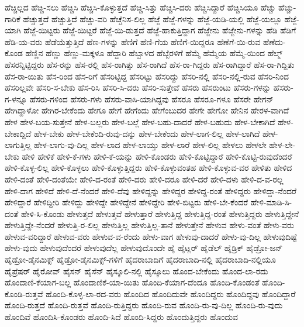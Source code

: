 {ಹೆಚ್ಚಿಲ್ಲದ
ಹೆಚ್ಚಿ-ಸಲು
ಹೆಚ್ಚಿಸಿ
ಹೆಚ್ಚಿಸಿ-ಕೊಳ್ಳುತ್ತದೆ
ಹೆಚ್ಚಿ-ಸಿತ್ತು
ಹೆಚ್ಚಿಸಿ-ದರು
ಹೆಚ್ಚಿಸಿದ್ದಾರೆ
ಹೆಚ್ಚಿಸಿಯೂ
ಹೆಚ್ಚು
ಹೆಚ್ಚು-ಗಾರಿಕೆ
ಹೆಚ್ಚುತ್ತದೆ
ಹೆಚ್ಚುತ್ತಿದೆ
ಹೆಚ್ಚು-ವರಿ
ಹೆಚ್ಚೆನಿಸ-ಲಿಲ್ಲ
ಹೆಜ್ಜೆ
ಹೆಜ್ಜೆ-ಗಳನ್ನು
ಹೆಜ್ಜೆ-ಯಡಿ-ಯಲ್ಲಿ
ಹೆಜ್ಜೆ-ಯಲ್ಲೂ
ಹೆಜ್ಜೆ-ಯಾಗಿ
ಹೆಜ್ಜೆ-ಯಿಟ್ಟರು
ಹೆಜ್ಜೆ-ಯಿಟ್ಟರೆ
ಹೆಜ್ಜೆ-ಯಿ-ಡುತ್ತದೆ
ಹೆಜ್ಜೆ-ಹಾಕುತ್ತಿದ್ದಾಗ
ಹೆಜ್ಜೇನು
ಹೆಜ್ಜೇನು-ಗಳನ್ನು
ಹೆಡಿ
ಹೆಡಿಗೆ
ಹೆಡಿ-ಯ-ವರು
ಹೆಡೆಯೆತ್ತುತ್ತಿದೆ
ಹೆಣ-ಗಳನ್ನು
ಹೆಣಿಗೆ
ಹೆಣಿ-ಗೆಯ
ಹೆಣಿಗೆ-ಯಿದ್ದರೂ
ಹೆಣೆಗೆ-ಯಿ-ರುವ
ಹೆಣೆದು-ಕೊಂಡ
ಹೆಣ್ಣಿನ
ಹೆಣ್ಣು
ಹೆಣ್ಣು-ಮಕ್ಕಳೂ
ಹೆದ್ದಾರಿ
ಹೆಬ್ಬಾಳದ
ಹೆಬ್ಬೆರಳಿಗೆ
ಹೆಮ್ಮೆ
ಹೆಮ್ಮೆಯ
ಹೆಮ್ಮೆ-ಯಿಂದ
ಹೆಲ್ಮ್
ಹೆಸರನ್ನಿಟ್ಟಿದ್ದರು
ಹೆಸ-ರನ್ನು
ಹೆಸ-ರಲ್ಲಿ
ಹೆಸ-ರಾಗಿತ್ತು
ಹೆಸ-ರಾಗಿದೆ
ಹೆಸ-ರಾ-ಗಿದ್ದರು
ಹೆಸ-ರಾಗಿದ್ದಾರೆ
ಹೆಸ-ರಾ-ಗಿದ್ದಿತು
ಹೆಸ-ರಾ-ಯಿತು
ಹೆಸ-ರಿಂದ
ಹೆಸ-ರಿಗೆ
ಹೆಸರಿಟ್ಟಿದ್ದ
ಹೆಸರಿಟ್ಟು
ಹೆಸರಿದ್ದು
ಹೆಸರಿ-ನಲ್ಲಿ
ಹೆಸರಿ-ನಲ್ಲಿ-ರುವ
ಹೆಸರಿ-ನಿಂದ
ಹೆಸರಿಲ್ಲವೇ
ಹೆಸರಿ-ಸ-ಬೇಕು
ಹೆಸ-ರಿಸಿ
ಹೆಸರಿ-ಸಿ-ದರು
ಹೆಸರಿ-ಸುತ್ತೇವೆ
ಹೆಸರು
ಹೆಸರುಂಟು
ಹೆಸರು-ಗಳನ್ನು
ಹೆಸರು-ಗ-ಳನ್ನೂ
ಹೆಸರು-ಗಳಿಂದ
ಹೆಸರು-ಗಳು
ಹೆಸರು-ವಾಸಿ-ಯಾಗಿದ್ದವು
ಹೆಸರೂ
ಹೆಸರೂ-ಗಳೂ
ಹೆಸರೇ
ಹೇಗನ್
ಹೇಗಿದ್ದಾಳೋ
ಹೇಗಿರ-ಬೇಕೆಂದು
ಹೇಗೂ
ಹೇಗೆ
ಹೇಗೆಂದು
ಹೇಗೆಂಬುದರ
ಹೇಗೇ
ಹೇಗೋ
ಹೇನಿನ
ಹೇರಳ-ವಾಗಿದೆ
ಹೇಳ
ಹೇಳ-ಬಯ-ಸುತ್ತೇನೆ
ಹೇಳ-ಬಲ್ಲರು
ಹೇಳ-ಬಲ್ಲೆ
ಹೇಳ-ಬಹು-ದಾದರೆ
ಹೇಳ-ಬಹುದು
ಹೇಳ-ಬೇಕಾಗಿದೆ
ಹೇಳ-ಬೇಕಾದ್ದಿದೆ
ಹೇಳ-ಬೇಕು
ಹೇಳ-ಬೇಕೆಂದಿ-ರುವು-ದನ್ನು
ಹೇಳ-ಬೇಕೆಂದು
ಹೇಳ-ಲಾಗ-ಲಿಲ್ಲ
ಹೇಳ-ಲಾಗಿದೆ
ಹೇಳ-ಲಾಗುತ್ತಿಲ್ಲ
ಹೇಳ-ಲಾಗು-ವು-ದಿಲ್ಲ
ಹೇಳ-ಲಾದ
ಹೇಳ-ಲಾಯ್ತು
ಹೇಳ-ಲಾರೆ
ಹೇಳ-ಲಿಲ್ಲ
ಹೇಳಲು
ಹೇಳಲೇ
ಹೇಳ-ಲೇ-ಬೇಕು
ಹೇಳಿ
ಹೇಳಿಕೆ
ಹೇಳಿ-ಕೆ-ಗಳು
ಹೇಳಿ-ಕೆ-ಯನ್ನು
ಹೇಳಿ-ಕೊಂಡರು
ಹೇಳಿ-ಕೊಟ್ಟಿದ್ದಾರೆ
ಹೇಳಿ-ಕೊಟ್ಟಿ-ರುವುದೆಂದರೆ
ಹೇಳಿ-ಕೊಳ್ಳ-ಲಿಲ್ಲ
ಹೇಳಿ-ಕೊಳ್ಳಲು
ಹೇಳಿ-ಕೊಳ್ಳುತ್ತಿದ್ದರು
ಹೇಳಿ-ಕೊಳ್ಳುವಂತಹ
ಹೇಳಿ-ಕೊಳ್ಳುವ-ವರ
ಹೇಳಿತು
ಹೇಳಿದ
ಹೇಳಿ-ದಂತೆ
ಹೇಳಿ-ದಂತೆಯೇ
ಹೇಳಿ-ದ-ರಂತೆ
ಹೇಳಿ-ದರು
ಹೇಳಿ-ದರೂ
ಹೇಳಿ-ದರೆ
ಹೇಳಿ-ದಳು
ಹೇಳಿ-ದ-ವ-ರಲ್ಲ
ಹೇಳಿ-ದಾಗ
ಹೇಳಿದೆ
ಹೇಳಿ-ದೆ-ನೆಂದರೆ
ಹೇಳಿ-ದೆವು
ಹೇಳಿದ್ದನ್ನು
ಹೇಳಿದ್ದರ
ಹೇಳಿದ್ದ-ರಂತೆ
ಹೇಳಿದ್ದರು
ಹೇಳಿದ್ದಾ-ನೆಂದರೆ
ಹೇಳಿದ್ದಾರೆ
ಹೇಳಿದ್ದೀರಿ
ಹೇಳಿದ್ದು
ಹೇಳಿದ್ದೇ
ಹೇಳಿದ್ದೇನೆ
ಹೇಳಿದ್ದೇರಿ
ಹೇಳಿ-ಬಿಟ್ಟರು
ಹೇಳಿ-ಬೇ-ಕೆಂದರೆ
ಹೇಳಿ-ಮಾಡಿ-ಸಿ-ದಂತೆ
ಹೇಳಿ-ಸಿ-ಕೊಂಡು
ಹೇಳುತ್ತದೆ
ಹೇಳುತ್ತವೆ
ಹೇಳುತ್ತಾರೆ
ಹೇಳುತ್ತಿದ್ದ
ಹೇಳುತ್ತಿದ್ದ-ರಂತೆ
ಹೇಳುತ್ತಿದ್ದರು
ಹೇಳುತ್ತಿದ್ದೇನೆ
ಹೇಳುತ್ತಿದ್ದೇ-ನೆಂದರೆ
ಹೇಳುತ್ತಿ-ರ-ಲಿಲ್ಲ
ಹೇಳುತ್ತಿಲ್ಲ
ಹೇಳುತ್ತಿಲ್ಲ-ತಾನೆ
ಹೇಳುತ್ತೇನೆ
ಹೇಳುವ
ಹೇಳು-ವಂತೆ
ಹೇಳು-ವರು
ಹೇಳುವ-ವರಿದ್ದಾರೆ
ಹೇಳುವ-ವರು
ಹೇಳುವ-ವ-ರೆಂದು
ಹೇಳು-ವಾಗ
ಹೇಳುವು-ದಾದರೆ
ಹೇಳು-ವು-ದಿಲ್ಲ
ಹೇಳುವುದಿಷ್ಟೆ
ಹೇಳು-ವುದು
ಹೇಳುವುದೆಂದರೆ
ಹೇಳುವುದೆಲ್ಲ
ಹೇಳುವುದೊಂದೇ
ಹೈ
ಹೈಟ್ಲರ್
ಹೈಡೆಲ್
ಹೈಡ್ರಿಕ್
ಹೈಡ್ರೋ-ಜನ್
ಹೈಡ್ರೋ-ಡೈನಮಿಕ್ಸ್
ಹೈಡ್ರೋ-ಡೈನಮಿಕ್ಸ್-ಗಳಿಗೆ
ಹೈದರಾಬಾದಿಗೆ
ಹೈದರಾಬಾದಿ-ನಲ್ಲಿ
ಹೈದರಾಬಾದಿ-ನಲ್ಲಿಯೂ
ಹೈಪ್ರೆಷರ್
ಹೈರೋವ್
ಹೈಸನ್
ಹೈಸೆನ್
ಹೈಸ್ಕೂಲಿ-ನಲ್ಲಿ
ಹೈಸ್ಕೂಲು
ಹೊಂದ-ಬೇಕೆಂದು
ಹೊಂದ-ಲಾ-ರದು
ಹೊಂದಾಣಿ-ಕೆಯಾಗ-ಬಲ್ಲ
ಹೊಂದಾಣಿಕೆ-ಯಾ-ಯಿತು
ಹೊಂದಿ-ಕೆಯಾಗ-ದೆಂದೂ
ಹೊಂದಿ-ಕೊಂಡಂತೆ
ಹೊಂದಿ-ಕೊಂಡಿ-ರುತ್ತವೆ
ಹೊಂದಿ-ಕೊಳ್ಳ-ಲಾ-ರದ-ವರು
ಹೊಂದಿದ
ಹೊಂದಿದುವೇ
ಹೊಂದಿದ್ದರು
ಹೊಂದಿದ್ದವು
ಹೊಂದಿದ್ದಾರೆ
ಹೊಂದಿ-ರುತ್ತದೆ
ಹೊಂದಿ-ರುತ್ತವೆ
ಹೊಂದಿ-ರುತ್ತಿದ್ದರು
ಹೊಂದಿ-ರುವ
ಹೊಂದಿ-ರು-ವು-ದಿಲ್ಲ
ಹೊಂದಿ-ರು-ವುದು
ಹೊಂದಿವೆ
ಹೊಂದಿಸಿ-ಕೊಂಡರು
ಹೊಂದಿ-ಸಿದೆ
ಹೊಂದಿ-ಸಿದ್ದರು
ಹೊಂದುತ್ತಿದ್ದರು
ಹೊಂದುವ
}
